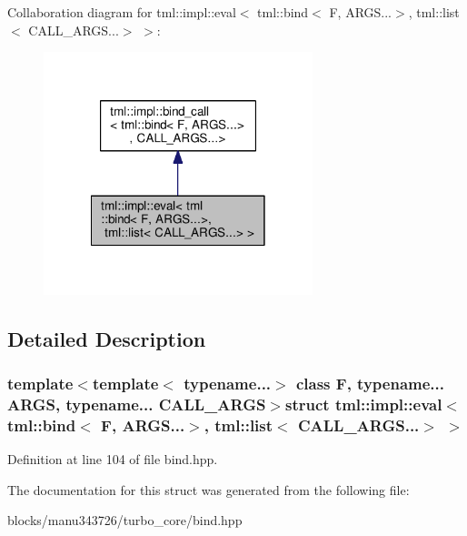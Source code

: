 Collaboration diagram for tml\+:\+:impl\+:\+:eval$<$ tml\+:\+:bind$<$ F, A\+R\+G\+S...$>$, tml\+:\+:list$<$ C\+A\+L\+L\+\_\+\+A\+R\+G\+S...$>$ $>$\+:
\nopagebreak
\begin{figure}[H]
\begin{center}
\leavevmode
\includegraphics[width=222pt]{structtml_1_1impl_1_1eval_3_01tml_1_1bind_3_01_f_00_01_a_r_g_s_8_8_8_4_00_01tml_1_1list_3_01_c_a71253ceeed2280e5d03974955e61eccd}
\end{center}
\end{figure}


\subsection{Detailed Description}
\subsubsection*{template$<$template$<$ typename...$>$ class F, typename... A\+R\+G\+S, typename... C\+A\+L\+L\+\_\+\+A\+R\+G\+S$>$struct tml\+::impl\+::eval$<$ tml\+::bind$<$ F, A\+R\+G\+S...$>$, tml\+::list$<$ C\+A\+L\+L\+\_\+\+A\+R\+G\+S...$>$ $>$}



Definition at line 104 of file bind.\+hpp.



The documentation for this struct was generated from the following file\+:\begin{DoxyCompactItemize}
\item 
blocks/manu343726/turbo\+\_\+core/bind.\+hpp\end{DoxyCompactItemize}
